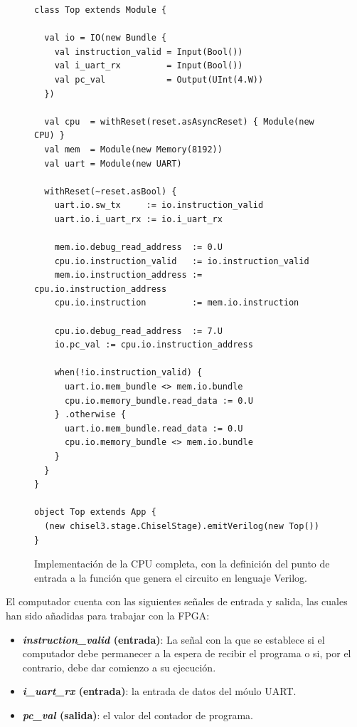 \vspace{+1cm}
\begin{figure}[h!]
\begin{lstlisting}[style=scalaStyle]
class Top extends Module {

  val io = IO(new Bundle {
    val instruction_valid = Input(Bool())
    val i_uart_rx         = Input(Bool())
    val pc_val            = Output(UInt(4.W))
  })
  
  val cpu  = withReset(reset.asAsyncReset) { Module(new CPU) }
  val mem  = Module(new Memory(8192))
  val uart = Module(new UART)

  withReset(~reset.asBool) {
    uart.io.sw_tx     := io.instruction_valid
    uart.io.i_uart_rx := io.i_uart_rx
    
    mem.io.debug_read_address  := 0.U
    cpu.io.instruction_valid   := io.instruction_valid
    mem.io.instruction_address := cpu.io.instruction_address
    cpu.io.instruction         := mem.io.instruction

    cpu.io.debug_read_address  := 7.U
    io.pc_val := cpu.io.instruction_address

    when(!io.instruction_valid) {
      uart.io.mem_bundle <> mem.io.bundle
      cpu.io.memory_bundle.read_data := 0.U
    } .otherwise {
      uart.io.mem_bundle.read_data := 0.U
      cpu.io.memory_bundle <> mem.io.bundle
    }
  }
}

object Top extends App {
  (new chisel3.stage.ChiselStage).emitVerilog(new Top())
}
\end{lstlisting}
\caption{Implementación de la CPU completa, con la definición del punto de entrada a la función que genera el circuito en lenguaje Verilog.}
\end{figure}

\vspace{+0.1cm}
El computador cuenta con las siguientes señales de entrada y salida, las cuales han sido añadidas para trabajar con la FPGA:

\begin{itemize}
  \item \textbf{\textit{instruction\_valid} (entrada)}: La señal con la que se establece si el computador debe permanecer a la espera de recibir el programa o si, por el contrario, debe dar comienzo a su ejecución.
  \vspace{-0.2cm}
  \item \textbf{\textit{i\_uart\_rx} (entrada)}: la entrada de datos del móulo UART.
  \vspace{-0.2cm}
  \item \textbf{\textit{pc\_val} (salida)}: el valor del contador de programa.
\end{itemize}



